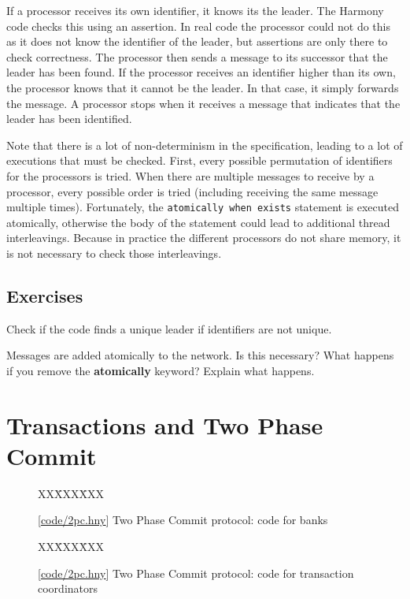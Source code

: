 \documentclass{report}
\newcommand{\harmonysource}[1]{
\begin{tabbing}
XX\=XXX\=XXX\kill
    
\end{tabbing}
}
\newcommand{\harmonylink}[1]{%
[\href{https://harmony.cs.cornell.edu/#1}{\underline{#1}}]%
}
\newenvironment{code}{
\tcolorbox
}{
\endtcolorbox
}
\begin{document}
If a processor receives its own identifier, it knows its the leader.
The Harmony code checks this using an assertion.
In real code the processor could not do this as it does not know
the identifier of the leader, but assertions are only there to check
correctness.
The processor then sends a message to its successor that the leader
has been found.
If the processor receives an identifier higher than its own, the
processor knows that it cannot be the leader.
In that case, it simply forwards the message.
A processor stops when it receives a message that indicates that
the leader has been identified.

Note that there is a lot of non-determinism in the specification, leading
to a lot of executions that must be checked.
First, every possible permutation of identifiers for the processors
is tried.  When there are multiple messages to receive by a processor,
every possible order is tried (including receiving the same message
multiple times).  Fortunately, the \texttt{atomically when exists} statement
is executed
atomically, otherwise the body of the statement could lead to additional
thread interleavings.  Because in practice the different processors do
not share memory, it is not necessary to check those interleavings.

\section*{Exercises}
\begin{problems}
\item Check if the code finds a unique leader if identifiers are not unique.
\item Messages are added atomically to the network.  Is this necessary?
What happens if you remove the \textbf{atomically} keyword?  Explain what happens.
\end{problems}

\chapter{Transactions and Two Phase Commit}
\label{ch:2pc}

\begin{figure}
\begin{code}
\harmonysource{2pc1}
\end{code}
\caption{\harmonylink{code/2pc.hny} Two Phase Commit protocol: code for banks}
\label{fig:2pc1}
\end{figure}

\begin{figure}
\begin{code}
\harmonysource{2pc2}
\end{code}
\caption{\harmonylink{code/2pc.hny} Two Phase Commit protocol: code for transaction coordinators}
\label{fig:2pc2}
\end{figure}
\end{document}
